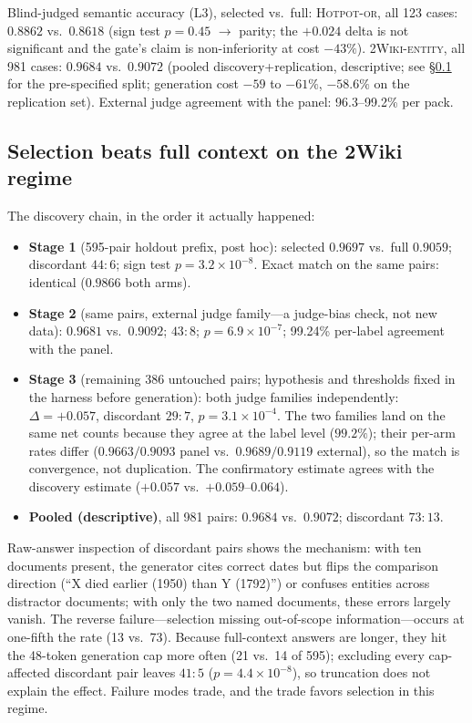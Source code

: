 \documentclass[11pt]{article}
\newcommand{\gateone}{\textsc{Hotpot-or}}
\newcommand{\gatetwo}{\textsc{2Wiki-entity}}
\begin{document}
Blind-judged semantic accuracy (L3), selected vs.\ full: \gateone{}, all
123 cases: $0.8862$ vs.\ $0.8618$ (sign test $p=0.45$ $\rightarrow$ parity;
the $+0.024$ delta is not significant and the gate's claim is
non-inferiority at cost $-43\%$). \gatetwo{}, all 981 cases: $0.9684$ vs.\
$0.9072$ (pooled discovery+replication, descriptive; see
\S\ref{sec:superiority} for the pre-specified split; generation cost
$-59$ to $-61\%$, $-58.6\%$ on the replication set). External judge
agreement with the panel: 96.3--99.2\% per pack.

\subsection{Selection beats full context on the 2Wiki regime}
\label{sec:superiority}

The discovery chain, in the order it actually happened:

\begin{itemize}
\item \textbf{Stage 1} (595-pair holdout prefix, post hoc): selected
$0.9697$ vs.\ full $0.9059$; discordant $44{:}6$; sign test
$p=3.2\times10^{-8}$. Exact match on the same pairs: identical ($0.9866$
both arms).
\item \textbf{Stage 2} (same pairs, external judge family---a judge-bias
check, not new data): $0.9681$ vs.\ $0.9092$; $43{:}8$;
$p=6.9\times10^{-7}$; 99.24\% per-label agreement with the panel.
\item \textbf{Stage 3} (remaining 386 untouched pairs; hypothesis and
thresholds fixed in the harness before generation): both judge families
independently: $\Delta=+0.057$, discordant $29{:}7$,
$p=3.1\times10^{-4}$. The two families land on the same net counts because
they agree at the label level ($99.2\%$); their per-arm rates differ
($0.9663/0.9093$ panel vs.\ $0.9689/0.9119$ external), so the match is
convergence, not duplication. The confirmatory estimate agrees with the
discovery estimate ($+0.057$ vs.\ $+0.059$--$0.064$).
\item \textbf{Pooled (descriptive)}, all 981 pairs: $0.9684$ vs.\
$0.9072$; discordant $73{:}13$.
\end{itemize}

Raw-answer inspection of discordant pairs shows the mechanism: with ten
documents present, the generator cites correct dates but flips the
comparison direction (``X died earlier (1950) than Y (1792)'') or confuses
entities across distractor documents; with only the two named documents,
these errors largely vanish. The reverse failure---selection missing
out-of-scope information---occurs at one-fifth the rate (13 vs.\ 73).
Because full-context answers are longer, they hit the 48-token generation
cap more often (21 vs.\ 14 of 595); excluding every cap-affected
discordant pair leaves $41{:}5$ ($p=4.4\times10^{-8}$), so truncation does
not explain the effect. Failure modes trade, and the trade favors
selection in this regime.
\end{document}
